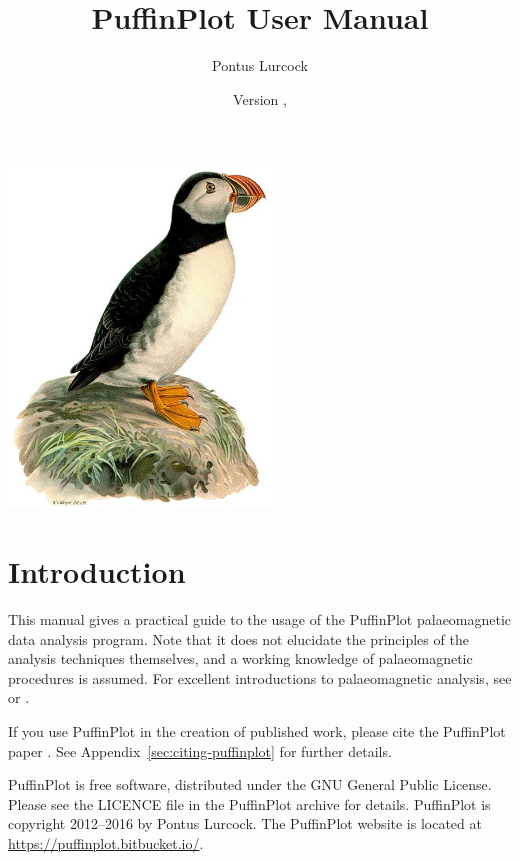 \documentclass[a4paper,british]{article}
\title{PuffinPlot User Manual}
\author{Pontus Lurcock}
\date{Version \HgVersion, \HgDate}
\newcommand{\ppcmd}[1]{\textsf{#1}} %
\begin{document}
\maketitle
\begin{center}
\includegraphics[width=70mm]{figures/Fratercula_arctica.jpeg}
\end{center}

\tableofcontents

\clearpage

\section{Introduction}

This manual gives a practical guide to the usage of the PuffinPlot
palaeomagnetic data analysis program. Note that it does not elucidate the
principles of the analysis techniques themselves, and a working knowledge of
palaeomagnetic procedures is assumed. For excellent introductions to
palaeomagnetic analysis, see \cite{tauxe2010paleomagnetism} or
\cite{butler1992paleomagnetism}.

If you use PuffinPlot in the creation of published work, please cite the
PuffinPlot paper \citep{lurcock2012puffinplot}. See
Appendix~\ref{sec:citing-puffinplot} for further details.

PuffinPlot is free software, distributed under the GNU General Public
License. Please see the \ppcmd{LICENCE} file in the PuffinPlot archive
for details. PuffinPlot is copyright 2012--2016 by Pontus Lurcock. The
PuffinPlot website is located at \url{https://puffinplot.bitbucket.io/}.
\end{document}
